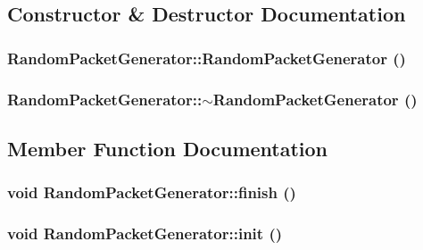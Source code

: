 \subsection{Constructor \& Destructor Documentation}
\hypertarget{classRandomPacketGenerator_e8b40229ae967bfcf93c8602d197c202}{
\subsubsection[{RandomPacketGenerator}]{\setlength{\rightskip}{0pt plus 5cm}RandomPacketGenerator::RandomPacketGenerator ()}}
\label{classRandomPacketGenerator_e8b40229ae967bfcf93c8602d197c202}


\hypertarget{classRandomPacketGenerator_1949b75c1466956c53e9df235e3405f7}{
\subsubsection[{$\sim$RandomPacketGenerator}]{\setlength{\rightskip}{0pt plus 5cm}RandomPacketGenerator::$\sim$RandomPacketGenerator ()}}
\label{classRandomPacketGenerator_1949b75c1466956c53e9df235e3405f7}




\subsection{Member Function Documentation}
\hypertarget{classRandomPacketGenerator_c1a1572bfc2c04b24e2d5c3d1bac2eb3}{
\subsubsection[{finish}]{\setlength{\rightskip}{0pt plus 5cm}void RandomPacketGenerator::finish ()}}
\label{classRandomPacketGenerator_c1a1572bfc2c04b24e2d5c3d1bac2eb3}


\hypertarget{classRandomPacketGenerator_8ede37fd74eea4e7183128d011715cdd}{
\subsubsection[{init}]{\setlength{\rightskip}{0pt plus 5cm}void RandomPacketGenerator::init ()}}
\label{classRandomPacketGenerator_8ede37fd74eea4e7183128d011715cdd}





